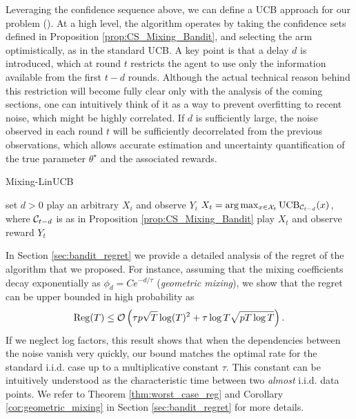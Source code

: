 Leveraging the confidence sequence above, we can define a UCB approach for our problem (). At a high level, the algorithm 
 operates by taking the confidence sets defined in Proposition 
\ref{prop:CS_Mixing_Bandit}, and selecting the arm optimistically, as in the standard UCB. A key point is that a delay 
$d$ is introduced, which at round $t$ restricts the agent to use only the information available from the first $t-d$ 
rounds. Although the actual technical reason behind this restriction will become fully clear only with the analysis of the 
coming sections, one can intuitively think of it as a way to prevent overfitting to recent noise, which might be 
highly correlated. If $d$ is sufficiently large, the noise observed in each round $t$ will 
be sufficiently decorrelated from the previous observations, which allows accurate estimation and uncertainty 
quantification of the true parameter $\theta^\star$ and the associated rewards.  

\begin{algorithm}[!h]
\caption{Mixing-LinUCB}\label{alg::Mixing_LinUCB}
\begin{algorithmic}
\State set $d>0$
\State play an arbitrary $X_i$ and observe $Y_i$
\EndFor
{}
\State  $X_{t} = \arg\max_{x \in \mathcal{X}_t} \mathrm{UCB}_{\mathcal{C}_{t-d}}(x)$, where $\mathcal{C}_{t-d}$ is as in Proposition \ref{prop:CS_Mixing_Bandit}
\State play $X_t$ and observe reward $Y_t$
\EndFor
\end{algorithmic}
\end{algorithm} 

In Section \ref{sec:bandit_regret} we provide a detailed analysis of the regret of the algorithm that we proposed. For instance, assuming that the mixing coefficients decay exponentially as $\phi_d = C e^{-d/\tau}$ (\emph{geometric mixing}), we show that the regret can be upper bounded in high probability as  \[\mathrm{Reg}(T) \leq \mathcal{O}\left(\tau p\sqrt{T}\log(T)^2+\tau \log T\sqrt{pT \log T}\right).\]
If we neglect log factors, this result shows that when the  dependencies between the noise vanish very quickly, our bound matches the optimal rate for the standard i.i.d. case up to a multiplicative constant $\tau$. This constant can be intuitively understood as the characteristic time between two \textit{almost} i.i.d. data points.
We refer to Theorem \ref{thm:worst_case_reg} and Corollary \ref{cor:geometric_mixing} in Section \ref{sec:bandit_regret} for more details. 
